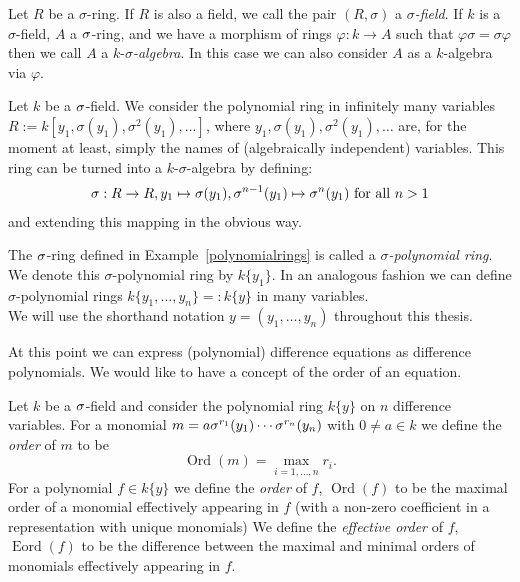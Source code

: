 \begin{defn}
Let $R$ be a $\sigma$-ring. If $R$ is also a field, we call the pair $(R,\sigma)$ a $\sigma$\emph{-field}.  
If $k$ is a $\sigma$-field, $A$ a $\sigma$-ring, and we have a morphism of rings $\varphi \colon k \rightarrow A$ such that $\varphi \sigma = \sigma \varphi$
 then we call $A$ a $k$-$\sigma$\emph{-algebra}.  In this case we can also consider $A$ as a $k$-algebra via $\varphi$.
\end{defn}

\begin{ex}\label{polynomialrings}
Let $k$ be a $\sigma$-field. We consider the polynomial ring in infinitely many variables $R:= k[y_1,\sigma(y_1),\sigma^2(y_1),\ldots]$,
 where $y_1,\sigma(y_1),\sigma^2(y_1),\ldots$ are, for the moment at least, simply the names of (algebraically independent) variables.
This ring can be turned into a $k$-$\sigma$-algebra by defining:
\begin{align*} 
\sigma:  R \rightarrow R, y_1 \mapsto \sigma(y_1), \sigma^{n-1}(y_1) \mapsto \sigma^{n}(y_1) \text{ for all } n > 1 
\end{align*}
and extending this mapping in the obvious way. 
\end{ex}

\begin{defn}
The $\sigma$-ring defined in Example~\ref{polynomialrings}  is called a $\sigma$\emph{-polynomial ring}. 
We denote this $\sigma$-polynomial ring by $k\{y_1\}$. In an analogous fashion we can define $\sigma$-polynomial rings $k\{y_1, \ldots, y_n \} =: k\{y\}$ in many variables. \\
We will use the shorthand notation $y = (y_1,\ldots,y_n)$ throughout this thesis.
\end{defn}

At this point we can express (polynomial) difference equations as difference polynomials. We would like to have a concept of the order of an equation.
\begin{defn}
Let $k$ be a $\sigma$-field and consider the polynomial ring $k\{y\}$ on $n$ difference variables. For a monomial $m = a \sigma^{r_1}(y_1) \cdots \sigma^{r_n}(y_n)$ with $0 \neq a \in k$ we define the \emph{order}  of $m$ to be
$$\operatorname{Ord}(m) = \max_{i = 1, \ldots, n} r_i. $$ For a polynomial $f \in k\{y\}$ we define the \emph{order} of $f$, $\operatorname{Ord}(f)$ to be the maximal order of a monomial effectively appearing in $f$ (with a non-zero coefficient in a representation with unique monomials)
 We define the \emph{effective order} of $f$, $\operatorname{Eord}(f)$ to be the difference between the maximal and minimal orders of monomials effectively appearing in $f$.
\end{defn}

